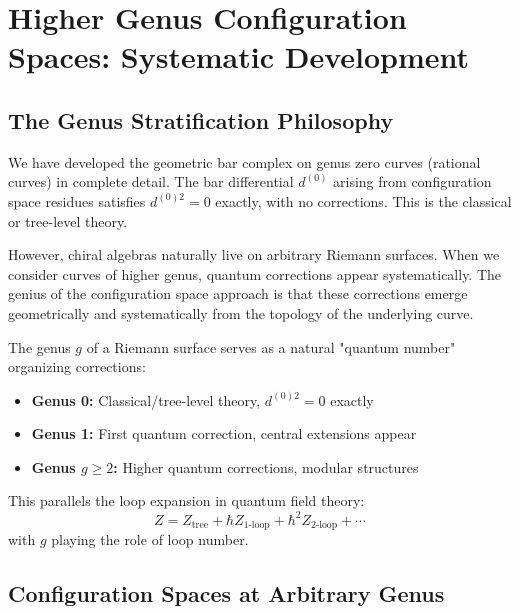 
\section{Higher Genus Configuration Spaces: Systematic Development}
\label{sec:higher-genus-config-complete}

\subsection{The Genus Stratification Philosophy}

We have developed the geometric bar complex on genus zero curves (rational curves) in complete detail. The bar differential $d^{(0)}$ arising from configuration space residues satisfies $d^{(0)2} = 0$ exactly, with no corrections. This is the classical or tree-level theory.

However, chiral algebras naturally live on arbitrary Riemann surfaces. When we consider curves of higher genus, quantum corrections appear systematically. The genius of the configuration space approach is that these corrections emerge geometrically and systematically from the topology of the underlying curve.

\begin{principle}
\label{princ:genus-quantum}
The genus $g$ of a Riemann surface serves as a natural "quantum number" organizing corrections:
\begin{itemize}
\item \textbf{Genus 0:} Classical/tree-level theory, $d^{(0)2} = 0$ exactly
\item \textbf{Genus 1:} First quantum correction, central extensions appear
\item \textbf{Genus $g \geq 2$:} Higher quantum corrections, modular structures
\end{itemize}

This parallels the loop expansion in quantum field theory:
\begin{equation}
Z = Z_{\text{tree}} + \hbar Z_{\text{1-loop}} + \hbar^2 Z_{\text{2-loop}} + \cdots
\end{equation}
with $g$ playing the role of loop number.
\end{principle}

\subsection{Configuration Spaces at Arbitrary Genus}

